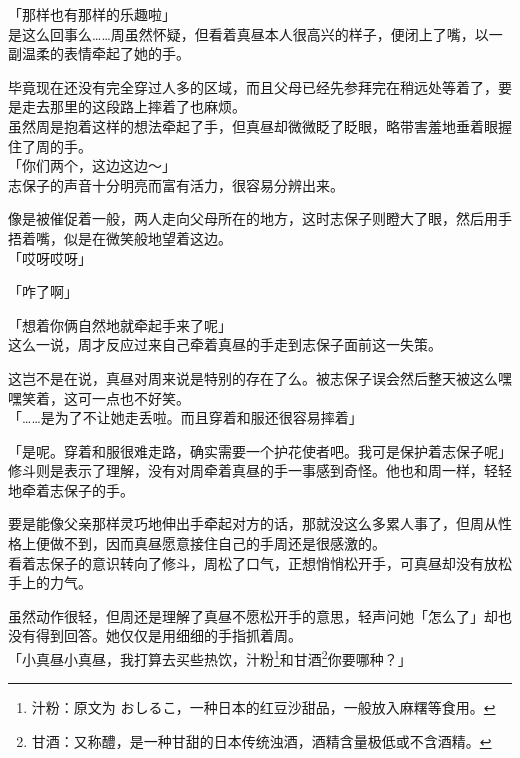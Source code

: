 「那样也有那样的乐趣啦」\\

是这么回事么……周虽然怀疑，但看着真昼本人很高兴的样子，便闭上了嘴，以一副温柔的表情牵起了她的手。

毕竟现在还没有完全穿过人多的区域，而且父母已经先参拜完在稍远处等着了，要是走去那里的这段路上摔着了也麻烦。\\

虽然周是抱着这样的想法牵起了手，但真昼却微微眨了眨眼，略带害羞地垂着眼握住了周的手。\\

「你们两个，这边这边～」\\

志保子的声音十分明亮而富有活力，很容易分辨出来。

像是被催促着一般，两人走向父母所在的地方，这时志保子则瞪大了眼，然后用手捂着嘴，似是在微笑般地望着这边。\\

「哎呀哎呀」

「咋了啊」

「想着你俩自然地就牵起手来了呢」\\

这么一说，周才反应过来自己牵着真昼的手走到志保子面前这一失策。

这岂不是在说，真昼对周来说是特别的存在了么。被志保子误会然后整天被这么嘿嘿笑着，这可一点也不好笑。\\

「……是为了不让她走丢啦。而且穿着和服还很容易摔着」

「是呢。穿着和服很难走路，确实需要一个护花使者吧。我可是保护着志保子呢」\\

修斗则是表示了理解，没有对周牵着真昼的手一事感到奇怪。他也和周一样，轻轻地牵着志保子的手。

要是能像父亲那样灵巧地伸出手牵起对方的话，那就没这么多累人事了，但周从性格上便做不到，因而真昼愿意接住自己的手周还是很感激的。\\

看着志保子的意识转向了修斗，周松了口气，正想悄悄松开手，可真昼却没有放松手上的力气。

虽然动作很轻，但周还是理解了真昼不愿松开手的意思，轻声问她「怎么了」却也没有得到回答。她仅仅是用细细的手指抓着周。\\

「小真昼小真昼，我打算去买些热饮，汁粉\footnote{汁粉：原文为 {\jpfont おしるこ}，一种日本的红豆沙甜品，一般放入麻糬等食用。}和甘酒\footnote{甘酒：又称醴，是一种甘甜的日本传统浊酒，酒精含量极低或不含酒精。}你要哪种？」

